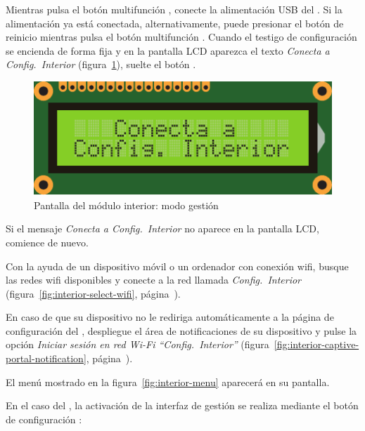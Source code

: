 \begin{enumeratecompact}

\item Mientras pulsa el botón multifunción , conecte la alimentación USB  del \MI. Si la alimentación ya está conectada, alternativamente, puede presionar el botón de reinicio  mientras pulsa el botón multifunción . Cuando el testigo de configuración  se encienda de forma fija y en la pantalla LCD  aparezca el texto \emph{Conecta a Config.~Interior} (figura~\ref{fig:screen-config}), suelte el botón .

\begin{figure}[!b]
  \centering
  \includegraphics[width=0.6\columnwidth]{images/screen-config}
  \caption{Pantalla del módulo interior: modo gestión}
  \label{fig:screen-config}
\end{figure}

Si el mensaje \emph{Conecta a Config.~Interior} no aparece en la pantalla LCD, comience de nuevo.

\item Con la ayuda de un dispositivo móvil o un ordenador con conexión wifi, busque las redes wifi disponibles y conecte a la red llamada \emph{Config.~Interior} (figura~\ref{fig:interior-select-wifi}, página~\pageref{fig:interior-select-wifi}).

\item En caso de que su dispositivo no le rediriga automáticamente a la página de configuración del \MI, despliegue el área de notificaciones de su dispositivo y pulse la opción \emph{Iniciar sesión en red Wi-Fi ``Config.~Interior''} (figura~\ref{fig:interior-captive-portal-notification}, pá\-gi\-na~\pageref{fig:interior-captive-portal-notification}).

\item El menú mostrado en la figura~\ref{fig:interior-menu} aparecerá en su pantalla.

\end{enumeratecompact}

En el caso del \MEE, la activación de la interfaz de gestión se realiza mediante el botón de configuración :

